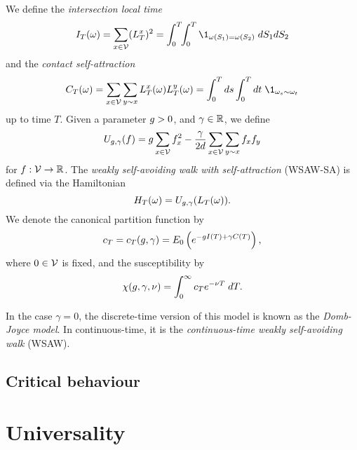 We define the \emph{intersection local time}
\begin{equation}
\label{e:ITdef}
I_T(\omega) = \sum_{x\in\vertices} (\lt^x_T)^2
  =
\int_0^T \!\! \int_0^T \1_{\omega(S_1)=\omega(S_2)} \; dS_1 dS_2
\end{equation}
and the \emph{contact self-attraction}
\begin{equation}
\label{e:CTdef}
C_T(\omega) =
  \sum_{x \in \vertices} \sum_{y \sim x} \lt_T^x(\omega) \lt_T^y(\omega)
  = \int_0^T ds \int_0^T dt \; \1_{\omega_{s} \sim \omega_{t}}
\end{equation}
up to time $T$.
Given a parameter $g > 0$,
and $\gamma \in {\mathbb R}$, we define
\begin{equation}
\label{e:Udef-neg}
U_{g,\gamma}(f)
=
g \sum_{x\in\mathcal{V}} f_x^2
- \frac{\gamma}{2d}
\sum_{x\in\mathcal{V}} \sum_{y \sim x} f_x f_y
\end{equation}
for $f : \mathcal{V} \rightarrow {\mathbb R}$.
The \emph{weakly self-avoiding walk with self-attraction} (WSAW-SA) is defined via the Hamiltonian
\begin{equation}
H_T(\omega) = U_{g,\gamma}(L_T(\omega)).
\end{equation}
We denote the canonical partition function by
\begin{equation}
c_T = c_T(g, \gamma) = E_0 \left( e^{-g I(T) + \gamma C(T)} \right),
\end{equation}
where $0 \in \mathcal{V}$ is fixed, and the susceptibility by
\begin{equation}
\chi(g, \gamma, \nu) = \int_0^\infty c_T e^{-\nu T} \; dT.
\end{equation}

In the case $\gamma = 0$, the discrete-time version of this model is known as
the \emph{Domb-Joyce model}. In continuous-time, it is the
\emph{continuous-time weakly self-avoiding walk} (WSAW).


\subsection{Critical behaviour}


\section{Universality}


